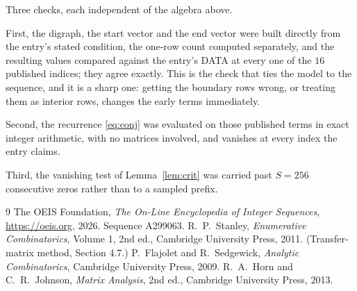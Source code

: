 \documentclass[11pt,a4paper]{article}
\theoremstyle{plain}
\theoremstyle{definition}
\begin{document}
Three checks, each independent of the algebra above.

First, the digraph, the start vector and the end vector were built directly from the
entry's stated condition, the one-row count computed separately, and the resulting values
compared against the entry's DATA at every one of the $16$ published indices; they
agree exactly. This is the check that ties the model to the sequence, and it is a sharp one:
getting the boundary rows wrong, or treating them as interior rows, changes the early terms
immediately.

Second, the recurrence \eqref{eq:conj} was evaluated on those published terms in exact
integer arithmetic, with no matrices involved, and vanishes at every index the entry claims.

Third, the vanishing test of Lemma~\ref{lem:crit} was carried past $S=256$ consecutive
zeros rather than to a sampled prefix.

\begin{thebibliography}{9}
 The OEIS Foundation, \emph{The On-Line Encyclopedia of Integer
Sequences}, \url{https://oeis.org}, 2026. Sequence A299063.
 R.~P.~Stanley, \emph{Enumerative Combinatorics}, Volume 1, 2nd ed.,
Cambridge University Press, 2011. (Transfer-matrix method, Section 4.7.)
 P.~Flajolet and R.~Sedgewick, \emph{Analytic Combinatorics}, Cambridge
University Press, 2009.
 R.~A.~Horn and C.~R.~Johnson, \emph{Matrix Analysis}, 2nd ed., Cambridge
University Press, 2013.
\end{thebibliography}
\end{document}
